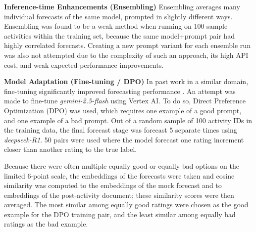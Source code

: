 \documentclass[12pt,a4paper]{article}
\let\citep\parencite
\begin{document}
\textbf{Inference-time Enhancements (Ensembling)}
Ensembling averages many individual forecasts of the same model, prompted in slightly different ways. Ensembling was found to be a weak method when running on 100 sample activities within the training set, because the same model+prompt pair had highly correlated forecasts. Creating a new prompt variant for each ensemble run was also not attempted due to the complexity of such an approach, its high API cost, and weak expected performance improvements. 



\textbf{Model Adaptation (Fine-tuning / DPO)}
In past work in a similar domain, fine-tuning significantly improved forecasting performance \citep{wenPredictingEmpiricalAI2025}. An attempt was made to fine-tune \emph{gemini-2.5-flash} using Vertex AI. To do so, Direct Preference Optimization (DPO) was used, which requires one example of a good prompt, and one example of a bad prompt. Out of a random sample of 100 activity IDs in the training data, the final forecast stage was forecast 5 separate times using \emph{deepseek-R1}. 50 pairs were used where the model forecast one rating increment closer than another rating to the true label.

Because there were often multiple equally good or equally bad options on the limited 6-point scale, the embeddings of the forecasts were taken and cosine similarity was computed to the embeddings of the mock forecast and to embeddings of the post-activity document; these similarity scores were then averaged. The most similar among equally good ratings were chosen as the good example for the DPO training pair, and the least similar among equally bad ratings as the bad example.  
\end{document}
